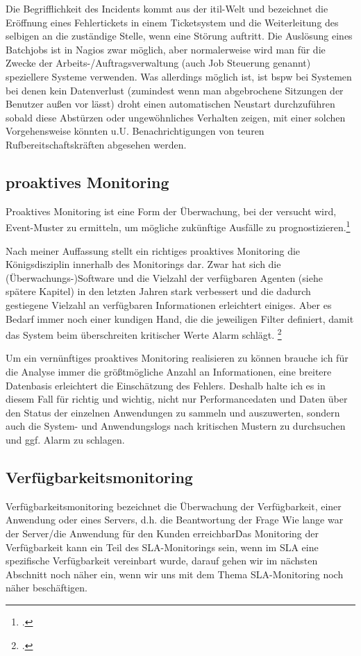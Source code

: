 \documentclass[12pt,a4paper,parskip,listof=totoc,bibliography=totoc]{scrreprt}
\begin{document}
	Die Begrifflichkeit des Incidents kommt aus der \acrshort{itil}-Welt und bezeichnet die Eröffnung eines Fehlertickets in einem Ticketsystem und die Weiterleitung des selbigen an die zuständige Stelle, wenn eine Störung auftritt. Die Auslösung eines Batchjobs ist in Nagios zwar möglich, aber normalerweise wird man für die Zwecke der Arbeits-/Auftragsverwaltung (auch Job Steuerung genannt) speziellere Systeme verwenden. Was allerdings möglich ist, ist \acrlong{bspw} bei Systemen bei denen kein Datenverlust (zumindest wenn man abgebrochene Sitzungen der Benutzer außen vor lässt) droht einen automatischen Neustart durchzuführen sobald diese Abstürzen oder ungewöhnliches Verhalten zeigen, mit einer solchen Vorgehensweise könnten u.U. Benachrichtigungen von teuren Rufbereitschaftskräften abgesehen werden.
	 
	\subsection{proaktives Monitoring}
	\glqq Proaktives Monitoring ist eine Form der Überwachung, bei der versucht wird, Event-Muster zu ermitteln, um mögliche zukünftige Ausfälle zu prognostizieren.\grqq \footcite[S. 511]{ebelitilv3}
	
	Nach meiner Auffassung stellt ein richtiges proaktives Monitoring die Königsdisziplin innerhalb des Monitorings dar. Zwar hat sich die (Überwachungs-)Software und die Vielzahl der verfügbaren Agenten (siehe spätere Kapitel) in den letzten Jahren stark verbessert und die dadurch gestiegene Vielzahl an verfügbaren Informationen erleichtert einiges. Aber es Bedarf immer noch einer kundigen Hand, die die jeweiligen Filter definiert, damit das System beim überschreiten kritischer Werte Alarm schlägt. \footcite{Borkmann2009}
	
	Um ein vernünftiges proaktives Monitoring realisieren zu können brauche ich für die Analyse immer die größtmögliche Anzahl an Informationen, eine breitere Datenbasis erleichtert die Einschätzung des Fehlers. Deshalb halte ich es in diesem Fall für richtig und wichtig, nicht nur Performancedaten und Daten über den Status der einzelnen Anwendungen zu sammeln und auszuwerten, sondern auch die System- und Anwendungslogs nach kritischen Mustern zu durchsuchen und ggf. Alarm zu schlagen.
	\subsection{Verfügbarkeitsmonitoring}
	Verfügbarkeitsmonitoring bezeichnet die Überwachung der Verfügbarkeit, einer Anwendung oder eines Servers, d.h. die Beantwortung der Frage \glqq Wie lange war der Server/die Anwendung für den Kunden erreichbar\grqq\. Das Monitoring der Verfügbarkeit kann ein Teil des SLA-Monitorings sein, wenn im SLA eine spezifische Verfügbarkeit vereinbart wurde, darauf gehen wir im nächsten Abschnitt noch näher ein, wenn wir uns mit dem Thema SLA-Monitoring noch näher beschäftigen.
\end{document}
